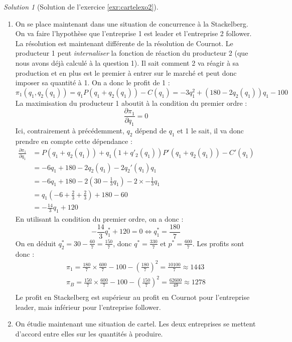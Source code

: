 \documentclass[
]{book}
\theoremstyle{definition}
\theoremstyle{definition}
\theoremstyle{definition}
\theoremstyle{definition}
\theoremstyle{remark}
\newtheorem*{solution}{Solution}
\begin{document}
\begin{solution}[Solution de l'exercice \ref{exr:cartelexo2}]
\begin{enumerate}
  Le profit de l'entreprise 1 est alors :
  \[\pi_1(q_1^*, q_2^*)=-3q_1^{*2}+(180-2q_2^*)q_1^*-100=\frac{5675}{4}\]
  Par symétrie, \(\pi_2(q_1^*, q_2^*)=\frac{5675}{4}\)=1418.75.
\item
  On se place maintenant dans une situation de concurrence à la Stackelberg.
  On va faire l'hypothèse que l'entreprise 1 est leader et l'entreprise 2 follower.
  La résolution est maintenant différente de la résolution de Cournot.
  Le producteur 1 peut \emph{internaliser} la fonction de réaction du producteur 2 (que nous avons déjà calculé à la question 1).
  Il sait comment 2 va réagir à sa production et en plus est le premier à entrer sur le marché et peut donc imposer sa quantité à 1.
  On a donc le profit de 1 :
  \[\pi_1(q_1, q_2(q_1))=q_1P(q_1+q_2(q_1))-C(q_1)=-3q_1^2+(180-2q_2(q_1))q_1-100\]
  La maximisation du producteur 1 aboutit à la condition du premier ordre :
  \[\frac{\partial \pi_1}{\partial q_1}=0\]
  Ici, contrairement à précédemment, \(q_2\) dépend de \(q_1\) et 1 le sait, il va donc prendre en compte cette dépendance :
  \begin{align*}
  \frac{\partial \pi_1}{\partial q_1}&=P(q_1+ q_2(q_1))+q_1(1+q'_2(q_1))P'(q_1+q_2(q_1))-C'(q_1)\\
  &=-6q_1+180-2q_2(q_1)-2q_2'(q_1)q_1\\
  &=-6q_1+180-2\left(30-\frac{1}{3}q_1\right)-2\times-\frac{1}{3}q_1\\
  &=q_1\left(-6+\frac{2}{3}+\frac{2}{3}\right)+180-60\\
  &=-\frac{14}{3}q_1+120
  \end{align*}
  En utilisant la condition du premier ordre, on a donc :
  \[-\frac{14}{3}q_1^*+120=0\Leftrightarrow q_1^*=\frac{180}{7}\]
  On en déduit \(q_2^*=30-\frac{60}{7}=\frac{150}{7}\), donc \(q^*=\frac{330}{7}\) et \(p^*=\frac{600}{7}\).
  Les profits sont donc :
  \begin{gather*}
  \pi_1=\frac{180}{7}\times\frac{600}{7}-100-\left(\frac{180}{7}\right)^2=\frac{10100}{7}\approx 1443\\
  \pi_B=\frac{150}{7}\times\frac{600}{7}-100-\left(\frac{150}{7}\right)^2=\frac{62600}{49}\approx 1278\\
  \end{gather*}
  Le profit en Stackelberg est supérieur au profit en Cournot pour l'entreprise leader, mais inférieur pour l'entreprise follower.
\item
  On étudie maintenant une situation de cartel.
  Les deux entreprises se mettent d'accord entre elles sur les quantités à produire.

\end{enumerate}
\end{solution}
\end{document}
